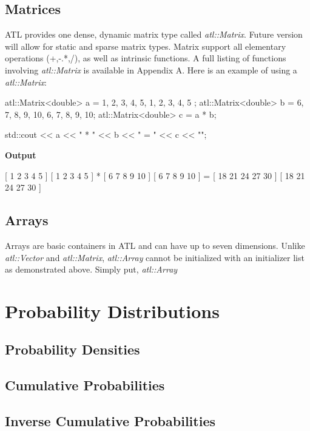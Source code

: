 \documentclass[12pt,a4paper]{article}
\begin{document}
\subsection{Matrices}
ATL provides one dense, dynamic matrix type called \textit{atl::Matrix}. Future version will allow for static and sparse matrix types. Matrix support all elementary operations (+,-.*,/), as well as intrinsic functions. A full listing of functions involving \textit{atl::Matrix} is available in Appendix A. Here is an example of using a \textit{atl::Matrix}:
\begin{cppsource}
 
  atl::Matrix<double> a = {
        {1, 2, 3, 4, 5},
        {1, 2, 3, 4, 5}
    };
    atl::Matrix<double> b = {
        {6, 7, 8, 9, 10},
        {6, 7, 8, 9, 10}};
    atl::Matrix<double> c = a * b;
    
    std::cout << a << " * \n" << b << " = \n" << c << "\n";
  
\end{cppsource}
\textbf{Output}
\begin{myoutput}

[ 1 2 3 4 5 ]
[ 1 2 3 4 5 ]
 * 
[ 6 7 8 9 10 ]
[ 6 7 8 9 10 ]
 = 
[ 18 21 24 27 30 ]
[ 18 21 24 27 30 ]

\end{myoutput}

\subsection{Arrays}
Arrays are basic containers in ATL and can have up to seven dimensions.  Unlike \textit{atl::Vector} and \textit{atl::Matrix},  \textit{atl::Array} cannot be initialized with an initializer list as demonstrated above. Simply put, \textit{atl::Array}
\section{Probability Distributions}
\subsection{Probability Densities}
\subsection{Cumulative Probabilities}
\subsection{Inverse Cumulative Probabilities}
\end{document}
